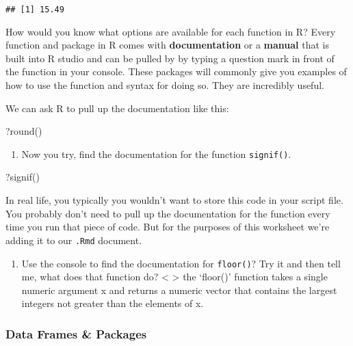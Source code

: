 \documentclass[
]{article}
\newenvironment{Shaded}{\begin{snugshade}}{\end{snugshade}}
\newcommand{\FunctionTok}[1]{\textcolor[rgb]{0.00,0.00,0.00}{#1}}
\newcommand{\NormalTok}[1]{#1}
\providecommand{\tightlist}{%
  \setlength{\itemsep}{0pt}\setlength{\parskip}{0pt}}
\begin{document}
\begin{verbatim}
## [1] 15.49
\end{verbatim}

How would you know what options are available for each function in R?
Every function and package in R comes with \textbf{documentation} or a
\textbf{manual} that is built into R studio and can be pulled by by
typing a question mark in front of the function in your console. These
packages will commonly give you examples of how to use the function and
syntax for doing so. They are incredibly useful.

We can ask R to pull up the documentation like this:

\begin{Shaded}
\begin{Highlighting}[]
\NormalTok{?}\FunctionTok{round}\NormalTok{()}
\end{Highlighting}
\end{Shaded}

\begin{enumerate}
\def\labelenumi{(\arabic{enumi})}
\setcounter{enumi}{17}
\tightlist
\item
  Now you try, find the documentation for the function
  \texttt{signif()}.
\end{enumerate}

\begin{Shaded}
\begin{Highlighting}[]
\NormalTok{?}\FunctionTok{signif}\NormalTok{()}
\end{Highlighting}
\end{Shaded}

In real life, you typically you wouldn't want to store this code in your
script file. You probably don't need to pull up the documentation for
the function every time you run that piece of code. But for the purposes
of this worksheet we're adding it to our \texttt{.Rmd} document.

\begin{enumerate}
\def\labelenumi{(\arabic{enumi})}
\setcounter{enumi}{18}
\tightlist
\item
  Use the console to find the documentation for \texttt{floor()}? Try it
  and then tell me, what does that function do? \textless{}
  \textgreater{} the `floor()' function takes a single numeric argument
  x and returns a numeric vector that contains the largest integers not
  greater than the elements of x.
\end{enumerate}

\hypertarget{data-frames-packages}{%
\subsubsection{Data Frames \& Packages}\label{data-frames-packages}}
\end{document}
